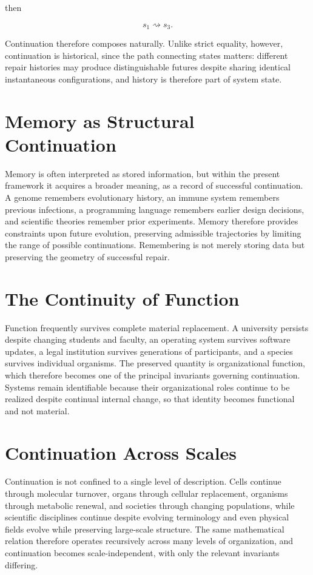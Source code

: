 \documentclass[11pt,oneside]{book}
\numberwithin{equation}{chapter}
\theoremstyle{definition}
\theoremstyle{plain}
\begin{document}
then

\[
s_1 \rightsquigarrow s_3.
\]

Continuation therefore composes naturally. Unlike strict equality, however, continuation is historical, since the path connecting states matters: different repair histories may produce distinguishable futures despite sharing identical instantaneous configurations, and history is therefore part of system state.

\section{Memory as Structural Continuation}

Memory is often interpreted as stored information, but within the present framework it acquires a broader meaning, as a record of successful continuation. A genome remembers evolutionary history, an immune system remembers previous infections, a programming language remembers earlier design decisions, and scientific theories remember prior experiments. Memory therefore provides constraints upon future evolution, preserving admissible trajectories by limiting the range of possible continuations. Remembering is not merely storing data but preserving the geometry of successful repair.

\section{The Continuity of Function}

Function frequently survives complete material replacement. A university persists despite changing students and faculty, an operating system survives software updates, a legal institution survives generations of participants, and a species survives individual organisms. The preserved quantity is organizational function, which therefore becomes one of the principal invariants governing continuation. Systems remain identifiable because their organizational roles continue to be realized despite continual internal change, so that identity becomes functional and not material.

\section{Continuation Across Scales}

Continuation is not confined to a single level of description. Cells continue through molecular turnover, organs through cellular replacement, organisms through metabolic renewal, and societies through changing populations, while scientific disciplines continue despite evolving terminology and even physical fields evolve while preserving large-scale structure. The same mathematical relation therefore operates recursively across many levels of organization, and continuation becomes scale-independent, with only the relevant invariants differing.
\end{document}
